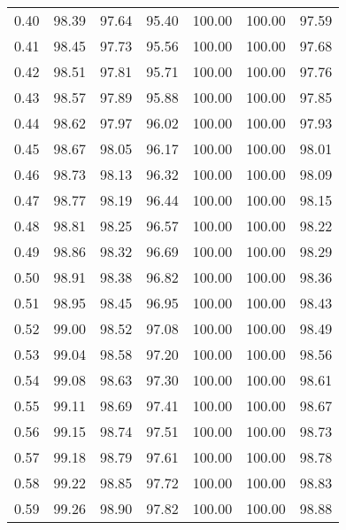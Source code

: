 \begin{tabular}{|c|c|c|c|c|c|c|}
      0.40 &     98.39 &     97.64 &      95.40 &  100.00 &     100.00 &         97.59 \\
      0.41 &     98.45 &     97.73 &      95.56 &  100.00 &     100.00 &         97.68 \\
      0.42 &     98.51 &     97.81 &      95.71 &  100.00 &     100.00 &         97.76 \\
      0.43 &     98.57 &     97.89 &      95.88 &  100.00 &     100.00 &         97.85 \\
      0.44 &     98.62 &     97.97 &      96.02 &  100.00 &     100.00 &         97.93 \\
      0.45 &     98.67 &     98.05 &      96.17 &  100.00 &     100.00 &         98.01 \\
      0.46 &     98.73 &     98.13 &      96.32 &  100.00 &     100.00 &         98.09 \\
      0.47 &     98.77 &     98.19 &      96.44 &  100.00 &     100.00 &         98.15 \\
      0.48 &     98.81 &     98.25 &      96.57 &  100.00 &     100.00 &         98.22 \\
      0.49 &     98.86 &     98.32 &      96.69 &  100.00 &     100.00 &         98.29 \\
      0.50 &     98.91 &     98.38 &      96.82 &  100.00 &     100.00 &         98.36 \\
      0.51 &     98.95 &     98.45 &      96.95 &  100.00 &     100.00 &         98.43 \\
      0.52 &     99.00 &     98.52 &      97.08 &  100.00 &     100.00 &         98.49 \\
      0.53 &     99.04 &     98.58 &      97.20 &  100.00 &     100.00 &         98.56 \\
      0.54 &     99.08 &     98.63 &      97.30 &  100.00 &     100.00 &         98.61 \\
      0.55 &     99.11 &     98.69 &      97.41 &  100.00 &     100.00 &         98.67 \\
      0.56 &     99.15 &     98.74 &      97.51 &  100.00 &     100.00 &         98.73 \\
      0.57 &     99.18 &     98.79 &      97.61 &  100.00 &     100.00 &         98.78 \\
      0.58 &     99.22 &     98.85 &      97.72 &  100.00 &     100.00 &         98.83 \\
      0.59 &     99.26 &     98.90 &      97.82 &  100.00 &     100.00 &         98.88 \\

\end{tabular}
